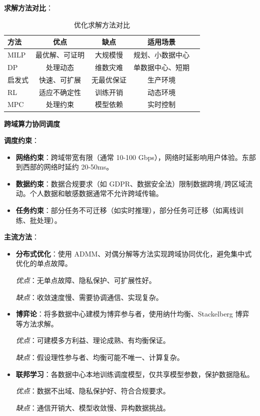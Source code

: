\documentclass[12pt,a4paper]{article}
\begin{document}
\textbf{求解方法对比}：

\begin{table}[h]
\centering
\caption{优化求解方法对比}
\label{tab:solver-compare}
\begin{tabular}{@{}lcccc@{}}
\toprule
\textbf{方法} & \textbf{优点} & \textbf{缺点} & \textbf{适用场景} \\
\midrule
MILP & 最优解、可证明 & 大规模慢 & 规划、小数据中心 \\
DP & 处理动态 & 维数灾难 & 单数据中心、短期 \\
启发式 & 快速、可扩展 & 无最优保证 & 生产环境 \\
RL & 适应不确定性 & 训练开销 & 动态环境 \\
MPC & 处理约束 & 模型依赖 & 实时控制 \\
\bottomrule
\end{tabular}
\end{table}

\textbf{跨域算力协同调度}

\textbf{调度约束}：

\begin{itemize}
    \item \textbf{网络约束}：跨域带宽有限（通常 10-100 Gbps），网络时延影响用户体验。东部到西部的网络时延约 20-50ms。
    \item \textbf{数据约束}：数据合规要求（如 GDPR、数据安全法）限制数据跨境/跨区域流动。个人数据和敏感数据通常不允许跨域传输。
    \item \textbf{任务约束}：部分任务不可迁移（如实时推理），部分任务可迁移（如离线训练、批处理）。
\end{itemize}

\textbf{主流方法}：

\begin{itemize}
    \item \textbf{分布式优化}：使用 ADMM、对偶分解等方法实现跨域协同优化，避免集中式优化的单点故障。
    
    \textit{优点}：无单点故障、隐私保护、可扩展性好。
    
    \textit{缺点}：收敛速度慢、需要协调通信、实现复杂。
    
    \item \textbf{博弈论}：将多数据中心建模为博弈参与者，使用纳什均衡、Stackelberg 博弈等方法求解。
    
    \textit{优点}：可建模多方利益、理论成熟、有均衡保证。
    
    \textit{缺点}：假设理性参与者、均衡可能不唯一、计算复杂。
    
    \item \textbf{联邦学习}：各数据中心本地训练调度模型，仅共享模型参数，保护数据隐私。
    
    \textit{优点}：数据不出域、隐私保护好、符合合规要求。
    
    \textit{缺点}：通信开销大、模型收敛慢、异构数据挑战。
\end{itemize}
\end{document}

